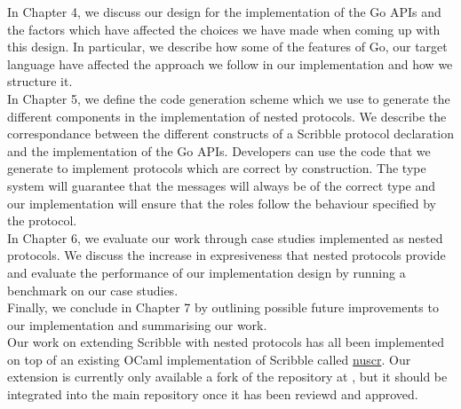 \documentclass[12pt,twoside]{report}
\begin{document}
In Chapter 4, we discuss our design for the implementation of the Go APIs and the factors which have affected the choices we have made when coming up with this design. In particular, we describe how some of the features of Go, our target language have affected the approach we follow in our implementation and how we structure it.\\

In Chapter 5, we define the code generation scheme which we use to generate the different components in the implementation of nested protocols. We describe the correspondance between the different constructs of a Scribble protocol declaration and the implementation of the Go APIs. Developers can use the code that we generate to implement protocols which are correct by construction. The type system will guarantee that the messages will always be of the correct type and our implementation will ensure that the roles follow the behaviour specified by the protocol.\\

In Chapter 6, we evaluate our work through case studies implemented as nested protocols. We discuss the increase in expresiveness that nested protocols provide and evaluate the performance of our implementation design by running a benchmark on our case studies.\\

Finally, we conclude in Chapter 7 by outlining possible future improvements to our implementation and summarising our work.\\

Our work on extending Scribble with nested protocols has all been implemented on top of an existing OCaml implementation of Scribble called \href{https://github.com/nuscr/nuscr}{nuscr}. Our extension is currently only available a fork of the repository at \href{https://github.com/becharrens/nuscr}{}, but it should be integrated into the main repository once it has been reviewd and approved.

\end{document}
